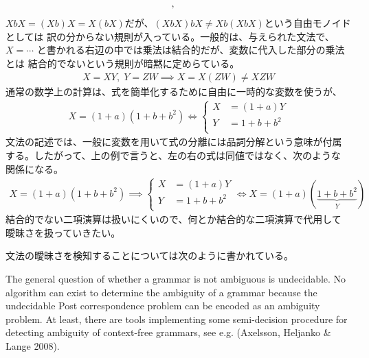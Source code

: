 {\begin{itemize}
\begin{equation*}
\begin{split}
{			},\quad \xymatrix@R=1ex@C=1ex{
			}
		\end{split}\end{equation*}
		$XbX=(Xb)X=X(bX)$だが、$(XbX)bX\neq Xb(XbX)$という自由モノイドとしては
		訳の分からない規則が入っている。一般的は、与えられた文法で、$X=\cdots$
		と書かれる右辺の中では乗法は結合的だが、変数に代入した部分の乗法とは
		結合的でないという規則が暗黙に定めらている。
		\begin{equation*}\begin{split}
			X = XY,\; Y = ZW \implies X = X(ZW) \neq XZW
		\end{split}\end{equation*}
		通常の数学上の計算は、式を簡単化するために自由に一時的な変数を使うが、
		\begin{equation*}\begin{split}
			X = (1 + a)(1 + b + b^2) \iff \left\{\begin{split}
				X &= (1 + a)Y \\
				Y &= 1 + b + b^2 \\
			\end{split}\right.
		\end{split}\end{equation*}
		文法の記述では、一般に変数を用いて式の分離には品詞分解という意味が付属
		する。したがって、上の例で言うと、左の右の式は同値ではなく、次のような
		関係になる。
		\begin{equation*}\begin{split}
			X = (1 + a)(1 + b + b^2) \implies \left\{\begin{split}
				X &= (1 + a)Y \\
				Y &= 1 + b + b^2 \\
			\end{split}\right.\iff X = (1 + a)(\underbrace{1 + b + b^2}_{Y})
		\end{split}\end{equation*}
		結合的でない二項演算は扱いにくいので、何とか結合的な二項演算で代用して
		曖昧さを扱っていきたい。
	\end{itemize} %

	文法の曖昧さを検知することについては次のように書かれている。
	\begin{center}\begin{boxedminipage}{.9\textwidth}
The general question of whether a grammar is not ambiguous is undecidable. No algorithm can exist to determine the ambiguity of a grammar because the undecidable Post correspondence problem can be encoded as an ambiguity problem. At least, there are tools implementing some semi-decision procedure for detecting ambiguity of context-free grammars, see e.g. (Axelsson, Heljanko \& Lange 2008).
	\end{boxedminipage}\end{center}

}
